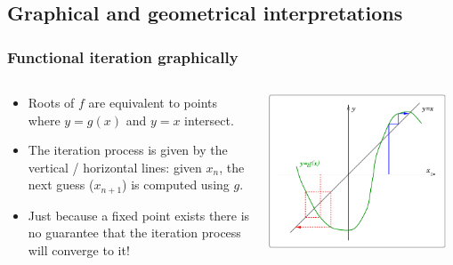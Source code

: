 \documentclass{beamer}
\begin{document}
\subsection{Graphical and geometrical interpretations}


\begin{frame}
  \frametitle{Functional iteration graphically}

  \begin{columns}
    \begin{column}{0.5\textwidth}
      \begin{itemize}
      \item Roots of $f$ are equivalent to points where $y = g(x)$ and
        $y = x$ intersect.
      \item The iteration process is given by the vertical /
        horizontal lines: given $x_n$, the next guess ($x_{n+1}$) is
        computed using $g$. \pause
      \item Just because a fixed point exists there is no
        guarantee that the iteration process will converge to it!
      \end{itemize}
    \end{column}
    \begin{column}{0.5\textwidth}
      \begin{center}
        \includegraphics[width=0.95\textwidth]{figures/picard}
      \end{center}
    \end{column}
  \end{columns}

\end{frame}
\end{document}
